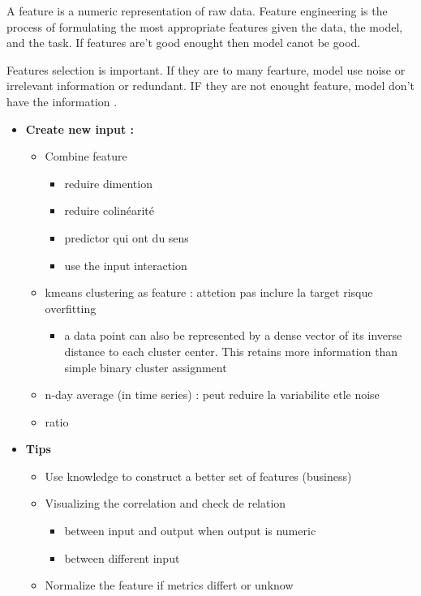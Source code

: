 \documentclass[]{book}
\providecommand{\tightlist}{%
  \setlength{\itemsep}{0pt}\setlength{\parskip}{0pt}}
\theoremstyle{definition}
\theoremstyle{definition}
\theoremstyle{definition}
\theoremstyle{remark}
\begin{document}
A feature is a numeric representation of raw data. Feature engineering
is the process of formulating the most appropriate features given the
data, the model, and the task. If features are't good enought then model
canot be good.

Features selection is important. If they are to many fearture, model use
noise or irrelevant information or redundant. IF they are not enought
feature, model don't have the information .

\begin{itemize}
\tightlist
\item
  \textbf{Create new input :}

  \begin{itemize}
  \tightlist
  \item
    Combine feature

    \begin{itemize}
    \tightlist
    \item
      reduire dimention
    \item
      reduire colinéarité
    \item
      predictor qui ont du sens
    \item
      use the input interaction
    \end{itemize}
  \item
    kmeans clustering as feature : attetion pas inclure la target risque
    overfitting

    \begin{itemize}
    \tightlist
    \item
      a data point can also be represented by a dense vector of its
      inverse distance to each cluster center. This retains more
      information than simple binary cluster assignment
    \end{itemize}
  \item
    n-day average (in time series) : peut reduire la variabilite etle
    noise
  \item
    ratio
  \end{itemize}
\item
  \textbf{Tips}

  \begin{itemize}
  \tightlist
  \item
    Use knowledge to construct a better set of features (business)
  \item
    Visualizing the correlation and check de relation

    \begin{itemize}
    \tightlist
    \item
      between input and output when output is numeric
    \item
      between different input
    \end{itemize}
  \item
    Normalize the feature if metrics differt or unknow
  \end{itemize}
\end{itemize}
\end{document}
